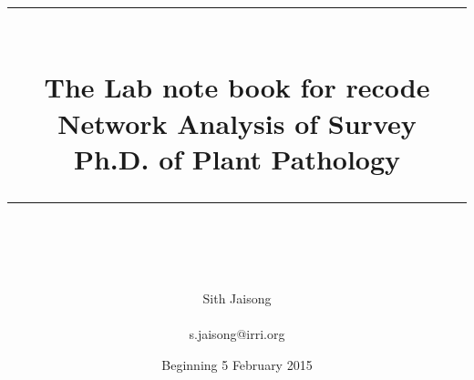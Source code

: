 \documentclass[idxtotoc,hyperref,openany]{labbook} %
\newcommand{\HRule}{\rule{\linewidth}{0.5mm}} %
\begin{document}

\frontmatter %
\title{
\begin{center}
\HRule \\[0.4cm]
{\Huge \bfseries The Lab note book for recode Network Analysis of Survey \\[0.5cm] \Large Ph.D. of Plant Pathology}\\[0.4cm] %
\HRule \\[1.5cm]
\end{center}
}
\author{\Huge Sith Jaisong \\ \\ \LARGE s.jaisong@irri.org \\[2cm]} %
\date{Beginning 5 February 2015} %
\maketitle
\tableofcontents
\mainmatter %










\end{document}
